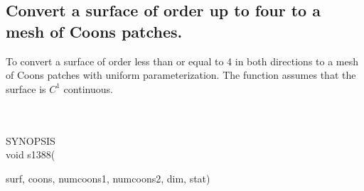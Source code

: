 \subsection{Convert a surface of order up to four to a mesh of Coons
patches.}
\begin{minipg1}
  To convert a surface of order less than or equal to 4 in both
  directions to a mesh of Coons patches with uniform parameterization.
  The function assumes that the surface is $C^1$ continuous.
\end{minipg1} \\ \\
SYNOPSIS\\
        \>void s1388(\begin{minipg3}
                        {\fov surf}, {\fov coons}, {\fov numcoons1}, {\fov numcoons2}, {\fov dim}, {\fov stat})
                \end{minipg3}\\[0.3ex]

